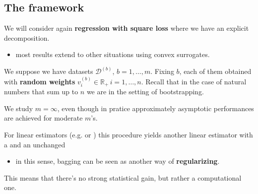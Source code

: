 \documentclass[
11pt,notheorems,hyperref={pdfauthor=whatever}
]{beamer}
\begin{document}
\subsection{The framework}
\begin{frame}
    We will consider again \alert{\textbf{regression with square loss}} where we have an explicit  decomposition.
    \begin{itemize}
        \item most results extend to other situations using convex surrogates.
    \end{itemize}
    We suppose we have datasets \(\mathcal{D}^{(b)}\), \(b=1,\dots,m\). Fixing \(b\), each of them obtained with \alert{\textbf{random weights}} \(v_i^{(b)}\in\mathbb{R}_+\,i=1,\dots,n\). Recall that in the case of natural numbers that sum up to \(n\) we are in the setting of bootstrapping.

    We study \(m=\infty\), even though in pratice approximately asymptotic performances are achieved for moderate \(m\)'s.

    For linear estimators (e.g.  or ) this procedure yields another linear estimator with a  and an unchanged 
    \begin{itemize}
        \item in this sense, bagging can be seen as another way of \alert{\textbf{regularizing}}.
    \end{itemize} 
    This means that there's no strong statistical gain, but rather a computational one.

\end{frame}
\end{document}
